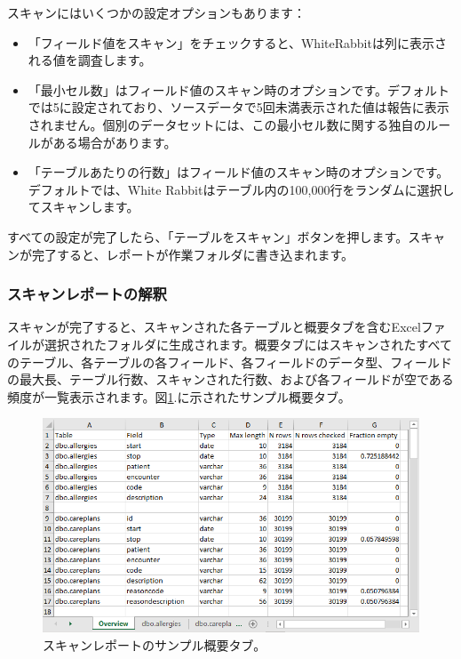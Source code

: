 \documentclass[
  11pt]{book}
\providecommand{\tightlist}{%
  \setlength{\itemsep}{0pt}\setlength{\parskip}{0pt}}
\theoremstyle{definition}
\theoremstyle{definition}
\theoremstyle{definition}
\theoremstyle{definition}
\theoremstyle{remark}
\begin{document}
スキャンにはいくつかの設定オプションもあります：

\begin{itemize}
\tightlist
\item
  「フィールド値をスキャン」をチェックすると、WhiteRabbitは列に表示される値を調査します。
\item
  「最小セル数」はフィールド値のスキャン時のオプションです。デフォルトでは5に設定されており、ソースデータで5回未満表示された値は報告に表示されません。個別のデータセットには、この最小セル数に関する独自のルールがある場合があります。
\item
  「テーブルあたりの行数」はフィールド値のスキャン時のオプションです。デフォルトでは、White Rabbitはテーブル内の100,000行をランダムに選択してスキャンします。
\end{itemize}

すべての設定が完了したら、「テーブルをスキャン」ボタンを押します。スキャンが完了すると、レポートが作業フォルダに書き込まれます。

\subsubsection*{スキャンレポートの解釈}\label{ux30b9ux30adux30e3ux30f3ux30ecux30ddux30fcux30c8ux306eux89e3ux91c8}

スキャンが完了すると、スキャンされた各テーブルと概要タブを含むExcelファイルが選択されたフォルダに生成されます。概要タブにはスキャンされたすべてのテーブル、各テーブルの各フィールド、各フィールドのデータ型、フィールドの最大長、テーブル行数、スキャンされた行数、および各フィールドが空である頻度が一覧表示されます。図\ref{fig:ScanOverviewTab}.に示されたサンプル概要タブ。

\begin{figure}

{\centering \includegraphics[width=1\linewidth]{images/ExtractTransformLoad/ScanOverviewTab} 

}

\caption{スキャンレポートのサンプル概要タブ。}\label{fig:ScanOverviewTab}
\end{figure}
\end{document}
